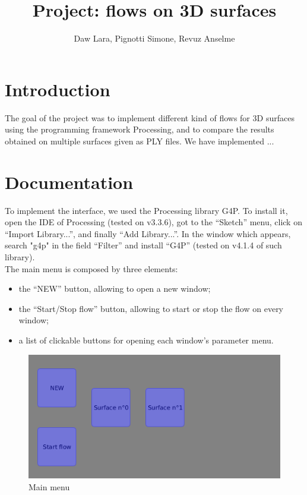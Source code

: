 \documentclass{article}
\title{Project: flows on 3D surfaces}
\author{Daw Lara, Pignotti Simone, Revuz Anselme}
\begin{document}
\maketitle

\section*{Introduction}
The goal of the project was to implement different kind of flows for 3D surfaces
using the programming framework Processing, and to compare the results obtained
on multiple surfaces given as PLY files. We have implemented ...

\section*{Documentation}
To implement the interface, we used the Processing library G4P. To install it,
open the IDE of Processing (tested on v3.3.6), got to the ``Sketch'' menu, click on
``Import Library...'', and finally ``Add Library...''. In the window which appears,
search "g4p" in the field ``Filter'' and install ``G4P'' (tested on v4.1.4 of such library).\\

The main menu is composed by three elements:
\begin{itemize}
  \item the ``NEW'' button, allowing to open a new window;
  \item the ``Start/Stop flow'' button, allowing to start or stop the flow on every window;
  \item a list of clickable buttons for opening each window's parameter menu.
\end{itemize}

\begin{center}

\end{center}
\begin{figure}[h]
  \begin{center}
    \includegraphics[width=.5\textwidth]{img/main.png}
    \caption{Main menu}
    \label{fig:main}
  \end{center}
\end{figure}
\end{document}
